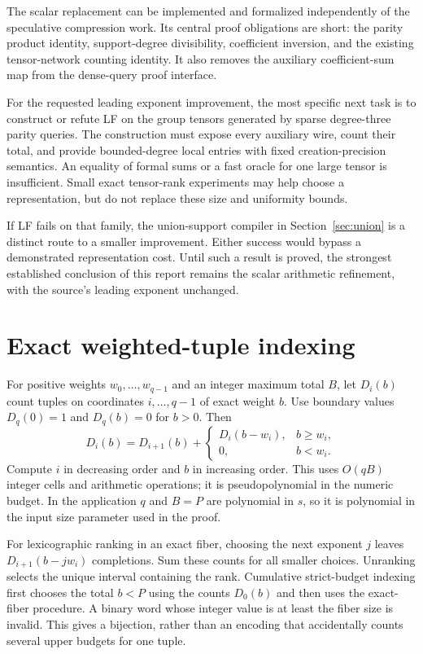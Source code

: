 \documentclass[11pt]{article}
\theoremstyle{definition}
\theoremstyle{remark}
\begin{document}
The scalar replacement can be implemented and formalized independently of
the speculative compression work. Its central proof obligations are short:
the parity product identity, support-degree divisibility, coefficient
inversion, and the existing tensor-network counting identity. It also removes
the auxiliary coefficient-sum map from the dense-query proof interface.

For the requested leading exponent improvement, the most specific next task
is to construct or refute LF on the group tensors generated by sparse
degree-three parity queries. The construction must expose every auxiliary
wire, count their total, and provide bounded-degree local entries with fixed
creation-precision semantics. An equality of formal sums or a fast oracle for
one large tensor is insufficient. Small exact tensor-rank experiments may
help choose a representation, but do not replace these size and uniformity
bounds.

If LF fails on that family, the union-support compiler in
Section~\ref{sec:union} is a distinct route to a smaller improvement. Either
success would bypass a demonstrated representation cost. Until such a result
is proved, the strongest established conclusion of this report remains the
scalar arithmetic refinement, with the source's leading exponent unchanged.

\appendix
\section{Exact weighted-tuple indexing}\label{app:rank}

For positive weights $w_0,\ldots,w_{q-1}$ and an integer maximum total $B$,
let $D_i(b)$ count tuples on coordinates $i,\ldots,q-1$ of exact weight $b$.
Use boundary values $D_q(0)=1$ and $D_q(b)=0$ for $b>0$. Then
\[
 D_i(b)=D_{i+1}(b)+
 \begin{cases}
 D_i(b-w_i),&b\ge w_i,\\
 0,&b<w_i.
 \end{cases}
\]
Compute $i$ in decreasing order and $b$ in increasing order. This uses
$O(qB)$ integer cells and arithmetic operations; it is pseudopolynomial in
the numeric budget. In the application $q$ and $B=P$ are polynomial in $s$,
so it is polynomial in the input size parameter used in the proof.

For lexicographic ranking in an exact fiber, choosing the next exponent
$j$ leaves $D_{i+1}(b-jw_i)$ completions. Sum these counts for all smaller
choices. Unranking selects the unique interval containing the rank. Cumulative
strict-budget indexing first chooses the total $b<P$ using the counts
$D_0(b)$ and then uses the exact-fiber procedure. A binary word whose integer
value is at least the fiber size is invalid. This gives a bijection, rather
than an encoding that accidentally counts several upper budgets for one
tuple.
\end{document}
